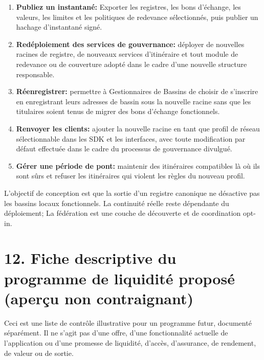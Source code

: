 \documentclass[11pt]{article}
\begin{document}
\begin{enumerate}[leftmargin=*]
\item \textbf{Publiez un instantané:} Exporter les registres, les bons d'échange, les valeurs, les limites et les politiques de redevance sélectionnés, puis publier un hachage d'instantané signé.
\item \textbf{Redéploiement des services de gouvernance:} déployer de nouvelles racines de registre, de nouveaux services d'itinéraire et tout module de redevance ou de couverture adopté dans le cadre d'une nouvelle structure responsable.
\item \textbf{Réenregistrer:} permettre à Gestionnaires de Bassins de choisir de s'inscrire en enregistrant leurs adresses de bassin sous la nouvelle racine sans que les titulaires soient tenus de migrer des bons d'échange fonctionnels.
\item \textbf{Renvoyer les clients:} ajouter la nouvelle racine en tant que profil de réseau sélectionnable dans les SDK et les interfaces, avec toute modification par défaut effectuée dans le cadre du processus de gouvernance divulgué.
\item \textbf{Gérer une période de pont:} maintenir des itinéraires compatibles là où ils sont sûrs et refuser les itinéraires qui violent les règles du nouveau profil.
\end{enumerate}
L'objectif de conception est que la sortie d'un registre canonique ne désactive pas les bassins locaux fonctionnels. La continuité réelle reste dépendante du déploiement; La fédération est une couche de découverte et de coordination opt-in.


\section*{12. Fiche descriptive du programme de liquidité proposé (aperçu non contraignant)}

Ceci est une liste de contrôle illustrative pour un programme futur, documenté séparément. Il ne s'agit pas d'une offre, d'une fonctionnalité actuelle de l'application ou d'une promesse de liquidité, d'accès, d'assurance, de rendement, de valeur ou de sortie.
\end{document}
